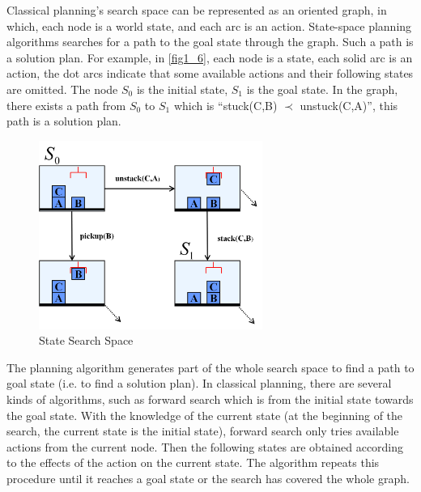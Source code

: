 Classical planning’s search space can be represented as an oriented graph, in which, each node is a world state, and each arc is an action. State-space planning algorithms searches for a path to the goal state through the graph. Such a path is a solution plan. For example, in \autoref{fig1_6}, each node is a state, each solid arc is an action, the dot arcs indicate that some available actions and their following states are omitted. The node $S_0$ is the initial state, $S_1$ is the goal state. In the graph, there exists a path from $S_0$ to $S_1$ which is “stuck(C,B) $\prec$ unstuck(C,A)”, this path is a solution plan.

\begin{figure}[H]
    \center
    \includegraphics[width=0.65\textwidth]{./images/1_6.png}
    \caption{State Search Space}
    \label{fig1_6}
\end{figure}

The planning algorithm generates part of the whole search space to find a path to goal state (i.e. to find a solution plan). In classical planning, there are several kinds of algorithms, such as forward search which is from the initial state towards the goal state. With the knowledge of the current state (at the beginning of the search, the current state is the initial state), forward search only tries available actions from the current node. Then the following states are obtained according to the effects of the action on the current state. The algorithm repeats this procedure until it reaches a goal state or the search has covered the whole graph.


